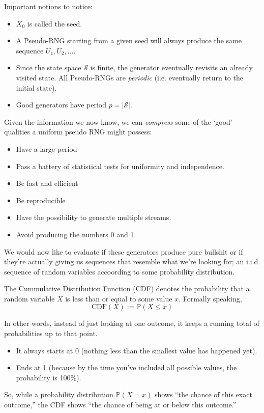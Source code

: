 \begin{remark}
    Important notions to notice:
\begin{itemize}
    \item $X_0$ is called the seed.
    \item A Pseudo-RNG starting from a given seed will always produce the same sequence $U_1, U_2, \dots$.
    \item Since the state space $\mathcal{S}$ is finite, the generator eventually revisits an already visited state. All Pseudo-RNGs are \textit{periodic} (i.e. eventually return to the initial state).
    \item Good generators have period $p = |\mathcal{S}|$.
\end{itemize}
\end{remark}

\vspace{0.2cm}

Given the information we now know, we can \textit{compress} some of the `good' qualities a uniform pseudo RNG might possess:
\begin{itemize}
        \item Have a large period
        \item Pass a battery of statistical tests for uniformity and independence.
        \item Be fast and efficient
        \item Be reproducible
        \item Have the possibility to generate multiple streams.
        \item Avoid producing the numbers 0 and 1.
\end{itemize} 

We would now like to evaluate if these generators produce pure bullshit or if they're actually giving us sequences that resemble what we're looking for; an i.i.d. sequence of random variables accoording to some probability distribution.

\begin{remark}
    The Cummulative Distribution Function (CDF) denotes the probability that a random variable $X$ is less than or equal to some value $x$. Formally speaking,
    $$\text{CDF}(X) := \mathbb{P}(X \leq x)$$
    
    In other words, instead of just looking at one outcome, it keeps a running total of probabilities up to that point. 
    \begin{itemize}
        \item It always starts at 0 (nothing less than the smallest value has happened yet).
        \item Ends at 1 (because by the time you’ve included all possible values, the probability is 100\%).
    \end{itemize} 
    So, while a probability distribution $\mathbb{P}(X=x)$ shows “the chance of this exact outcome,” the CDF shows “the chance of being at or below this outcome.”
\end{remark}

